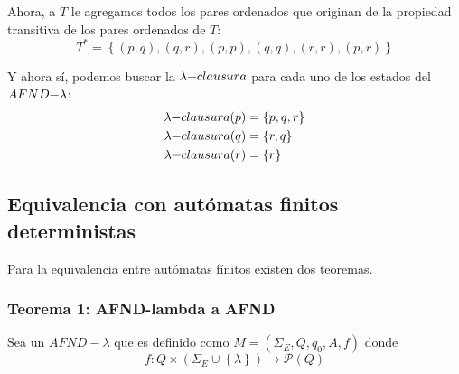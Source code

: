 \documentclass[12pt]{article}
\begin{document}
Ahora, a $ T $ le agregamos todos los pares ordenados que originan de la propiedad transitiva de los pares ordenados de $ T $:
\[
T^{*}=\left\{(p,q),(q,r),(p,p),(q,q),(r,r),(p,r)\right\}
\]

Y ahora sí, podemos buscar la $ \lambda\text{{\textminus}}clausura $ para cada uno de los estados del $ AFND\text{{\textminus}}\lambda $:
\begin{align*}
  \lambda\text{{\textminus}}clausura(p) &= \left\{p,q,r\right\}\\
  \lambda\text{{\textminus}}clausura(q) &= \left\{r,q\right\}\\
  \lambda\text{{\textminus}}clausura(r) &= \left\{r\right\}
\end{align*}

\subsection{Equivalencia con autómatas finitos deterministas}
Para la equivalencia entre autómatas fínitos existen dos teoremas.
\subsubsection{Teorema 1: AFND-lambda a AFND}

Sea un $ AFND-\lambda $ que es definido como $ M = (\Sigma_{E},Q,q_{0},A,f) $ donde
\[
f:Q\times (\Sigma_{E} \cup \left\{\lambda\right\}) \to \mathcal{P}(Q) 
\]
\end{document}
